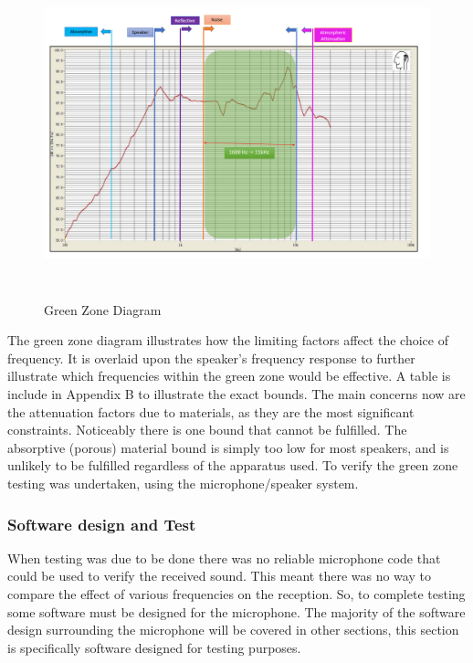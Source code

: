 \begin{figure}[H]
\centering
\noindent\includegraphics[width=16.64cm,height=9.5cm]{./images/greenZone.png}
\caption{Green Zone Diagram}
\label{fig:gZone}
\end{figure}

The green zone diagram illustrates how the limiting factors affect the choice of frequency. It is overlaid upon the speaker’s frequency response to further illustrate which frequencies within the green zone would be effective. A table is include in Appendix B to illustrate the exact bounds. The main concerns now are the attenuation factors due to materials, as they are the most significant constraints. Noticeably there is one bound that cannot be fulfilled. The absorptive (porous) material bound is simply too low for most speakers, and is unlikely to be fulfilled regardless of the apparatus used. To verify the green zone testing was undertaken, using the microphone/speaker system. 

\subsubsection{Software design and Test}

When testing was due to be done there was no reliable microphone code that could be used to verify the received sound. This meant there was no way to compare the effect of various frequencies on the reception. So, to complete testing some software must be designed for the microphone. The majority of the software design surrounding the microphone will be covered in other sections, this section is specifically software designed for testing purposes. \\

